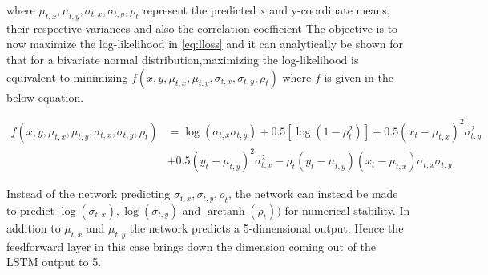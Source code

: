 \documentclass{article}
\DeclareMathOperator\arctanh{arctanh}
\begin{document}
\begin{itemize}
where $\mu_{t,x},\mu_{t,y}, \sigma_{t,x}, \sigma_{t,y}, \rho_t$ represent the predicted x and y-coordinate means, their respective variances and also the correlation coefficient
The objective is to now maximize the log-likelihood in \ref{eq:lloss} and it can analytically be shown for that for a bivariate normal distribution,maximizing the log-likelihood is equivalent to minimizing $f(x,y,\mu_{t,x},\mu_{t,y}, \sigma_{t,x}, \sigma_{t,y}, \rho_t)$ where $f$ is given in the below equation. 

\begin{equation}\label{eq:lloss_minimize}
\begin{split}
    f(x,y,\mu_{t,x},\mu_{t,y}, \sigma_{t,x}, \sigma_{t,y}, \rho_t)&=    \log(\sigma_{t,x}\sigma_{t,y})+0.5[\log(1-\rho_t^2)]+0.5(x_t-\mu_{t,x})^2\sigma_{t,y}^2\\ &+0.5(y_t-\mu_{t,y})^2\sigma_{t,x}^2 -\rho_t(y_t-\mu_{t,y})(x_t-\mu_{t,x})\sigma_{t,x}\sigma_{t,y}
\end{split}
\end{equation}

Instead of the network predicting $\sigma_{t,x}, \sigma_{t,y}, \rho_t$, the network can instead be made to predict $\log(\sigma_{t,x}), \log(\sigma_{t,y})$ and $\arctanh(\rho_t))$ for numerical stability. In addition to $\mu_{t,x}$ and $\mu_{t,y}$ the network predicts a 5-dimensional output. Hence the feedforward layer in this case brings down the dimension coming out of the LSTM output to 5. 
 \end{itemize}
\end{document}
